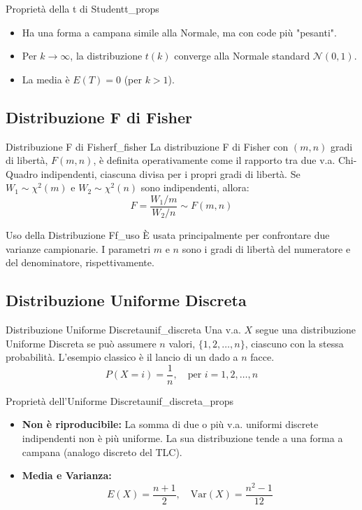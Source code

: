 \begin{proposizione}{Proprietà della t di Student}{t_props}
\begin{itemize}
    \item Ha una forma a campana simile alla Normale, ma con code più "pesanti".
    \item Per \(k \to \infty\), la distribuzione \(t(k)\) converge alla Normale standard \(\mathcal{N}(0,1)\).
    \item La media è \(E(T)=0\) (per \(k>1\)).
\end{itemize}
\end{proposizione}

\subsection{Distribuzione F di Fisher}

\begin{definizione}{Distribuzione F di Fisher}{f_fisher}
La distribuzione F di Fisher con \((m, n)\) gradi di libertà, \(F(m,n)\), è definita operativamente come il rapporto tra due v.a. Chi-Quadro indipendenti, ciascuna divisa per i propri gradi di libertà.
Se \(W_1 \sim \chi^2(m)\) e \(W_2 \sim \chi^2(n)\) sono indipendenti, allora:
\[
F = \frac{W_1/m}{W_2/n} \sim F(m,n) \text{}
\]
\end{definizione}

\begin{nota}{Uso della Distribuzione F}{f_uso}
È usata principalmente per confrontare due varianze campionarie. I parametri \(m\) e \(n\) sono i gradi di libertà del numeratore e del denominatore, rispettivamente.
\end{nota}

\subsection{Distribuzione Uniforme Discreta}

\begin{definizione}{Distribuzione Uniforme Discreta}{unif_discreta}
Una v.a. \(X\) segue una distribuzione Uniforme Discreta se può assumere \(n\) valori, \(\{1, 2, \dots, n\}\), ciascuno con la stessa probabilità. L'esempio classico è il lancio di un dado a \(n\) facce.
\[
P(X = i) = \frac{1}{n}, \quad \text{per } i=1, 2, \dots, n
\]
\end{definizione}

\begin{proposizione}{Proprietà dell'Uniforme Discreta}{unif_discreta_props}
\begin{itemize}
    \item \textbf{Non è riproducibile:} La somma di due o più v.a. uniformi discrete indipendenti non è più uniforme. La sua distribuzione tende a una forma a campana (analogo discreto del TLC).
    \item \textbf{Media e Varianza:}
    \[ E(X) = \frac{n+1}{2}, \quad \text{Var}(X) = \frac{n^2-1}{12} \]
\end{itemize}
\end{proposizione}

